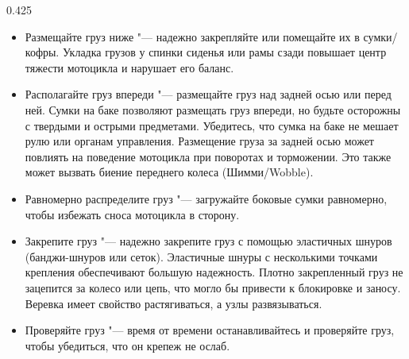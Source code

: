 \begin{langblock}{0.425}
\begin{rus}
		\begin{itemize}[noitemsep]
			\item Размещайте груз ниже "--- надежно закрепляйте или помещайте их в сумки/кофры. Укладка грузов у спинки сиденья или рамы сзади повышает центр тяжести мотоцикла и нарушает его баланс.
			\item Располагайте груз впереди "--- размещайте груз над задней осью или перед ней. Сумки на баке позволяют размещать груз впереди, но будьте осторожны с твердыми и острыми предметами. Убедитесь, что сумка на баке не мешает рулю или органам управления. Размещение груза за задней осью может повлиять на поведение мотоцикла при поворотах и торможении. Это также может вызвать биение переднего колеса (Шимми/Wobble).
			\item Равномерно распределите груз "--- загружайте боковые сумки равномерно, чтобы избежать сноса мотоцикла в сторону.
			\item Закрепите груз "--- надежно закрепите груз с помощью эластичных шнуров (банджи-шнуров или сеток). Эластичные шнуры с несколькими точками крепления обеспечивают большую надежность. Плотно закрепленный груз не зацепится за колесо или цепь, что могло бы привести к блокировке и заносу. Веревка имеет свойство растягиваться, а узлы развязываться.
			\item Проверяйте груз "--- время от времени останавливайтесь и проверяйте груз, чтобы убедиться, что он крепеж не ослаб.
		\end{itemize}
\end{rus}
\end{langblock}









